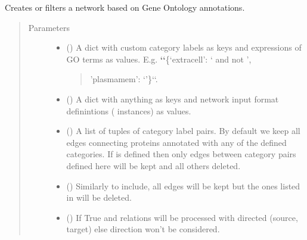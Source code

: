 \documentclass[letterpaper,10pt,english]{sphinxmanual}
\begin{document}
\begin{fulllineitems}
\begin{fulllineitems}
\label{\detokenize{reference:pypath.main.PyPath.network_by_go}}
Creates or filters a network based on Gene Ontology annotations.
\begin{quote}\begin{description}
\item[{Parameters}] \leavevmode\begin{itemize}
\item {} 
 () \textendash{} 
A dict with custom category labels as keys and expressions of
GO terms as values. E.g.
{\color{red}\bfseries{}{}`{}`}\{‘extracell’: ‘ and not ’,
\begin{quote}

’plasmamem’: ‘’\}{}`{}`.
\end{quote}


\item {} 
 () \textendash{} A dict with anything as keys and network input format definintions
( instances) as values.

\item {} 
 () \textendash{} A list of tuples of category label pairs. By default we keep all
edges connecting proteins annotated with any of the defined
categories. If  is defined then only edges between
category pairs defined here will be kept and all others deleted.

\item {} 
 () \textendash{} Similarly to include, all edges will be kept but the ones listed
in  will be deleted.

\item {} 
 () \textendash{} If True  and  relations will be processed
with directed (source, target) else direction won’t be considered.


\end{itemize}
\end{description}
\end{quote}
\end{fulllineitems}
\end{fulllineitems}
\end{document}
